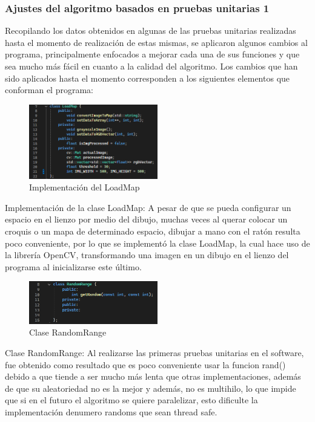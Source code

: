 \subsubsection{Ajustes del algoritmo basados en pruebas unitarias 1}
    Recopilando los datos obtenidos en algunas de las pruebas
        unitarias realizadas hasta el momento de realizaci\'on de estas
        mismas, se aplicaron algunos cambios al programa,
        principalmente enfocados a mejorar cada una de sus
        funciones y que sea mucho m\'as f\'acil en cuanto a la calidad
        del algoritmo.
        \vskip 0.5cm
    Los cambios que han sido aplicados hasta el momento
        corresponden a los siguientes elementos que conforman el
        programa:
        \vskip 0.5cm
    \begin{figure}[htbp]
        \centering
        \includegraphics[width=0.5\textwidth]{./images/Pruebas/simulador/image045.png}
        \caption{Implementaci\'on del LoadMap}
        \label{fig:Prueba unitaria 2}
    \end{figure}
    Implementaci\'on de la clase LoadMap: A pesar de que se
        pueda configurar un espacio en el lienzo por medio del
        dibujo, muchas veces al querar colocar un croquis o un mapa
        de determinado espacio, dibujar a mano con el rat\'on resulta
        poco conveniente, por lo que se implement\'o la clase
        LoadMap, la cual hace uso de la librer\'ia OpenCV,
        transformando una imagen en un dibujo en el lienzo del
        programa al inicializarse este \'ultimo.
        \vskip 0.5cm
    \begin{figure}[htbp]
        \centering
        \includegraphics[width=0.5\textwidth]{./images/Pruebas/simulador/image046.png}
        \caption{Clase RandomRange}
        \label{fig:Prueba unitaria 3}
    \end{figure}
    Clase RandomRange: Al realizarse las primeras pruebas
        unitarias en el software, fue obtenido como resultado que es
        poco conveniente usar la funcion rand() debido a que tiende
        a ser mucho m\'as lenta que otras implementaciones, adem\'as
        de que su aleatoriedad no es la mejor y adem\'as, no es
        multihilo, lo que impide que si en el futuro el algoritmo se
        quiere paralelizar, esto dificulte la implementaci\'on denumero randoms que sean thread safe.
        \vskip 0.5cm
